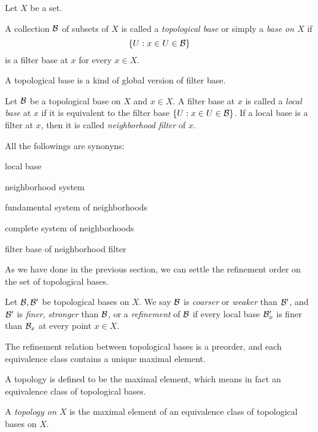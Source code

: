 \documentclass{../crs}
\begin{document}
Let $X$ be a set.
\begin{defn}
A collection $\mathcal{B}$ of subsets of $X$ is called a \emph{topological base} or simply a \emph{base on $X$} if
\[\{U:x\in U\in\mathcal{B}\}\]
is a filter base at $x$ for every $x\in X$.
\end{defn}

A topological base is a kind of global version of filter base.

\begin{defn}
Let $\mathcal{B}$ be a topological base on $X$ and $x\in X$.
A filter base at $x$ is called a \emph{local base} at $x$ if it is equivalent to the filter base $\{U:x\in U\in\mathcal{B}\}$.
If a local base is a filter at $x$, then it is called \emph{neighborhood filter} of $x$.
\end{defn}
All the followings are synonyns:
\begin{cond}
\item local base
\item neighborhood system
\item fundamental system of neighborhoods
\item complete system of neighborhoods
\item filter base of neighborhood filter
\end{cond}

As we have done in the previous section, we can settle the refinement order on the set of topological bases.

\begin{defn}
Let $\mathcal{B},\mathcal{B}'$ be topological bases on $X$.
We say $\mathcal{B}$ is \emph{coarser} or \emph{weaker} than $\mathcal{B}'$, and $\mathcal{B}'$ is \emph{finer}, \emph{stronger} than $\mathcal{B}$, or a \emph{refinement} of $\mathcal{B}$ if every local base $\mathcal{B}'_x$ is finer than $\mathcal{B}_x$ at every point $x\in X$.
\end{defn}
\begin{prop}
The refinement relation between topological bases is a preorder, and each equivalence class contains a unique maximal element.
\end{prop}
\begin{pf}
\end{pf}

A topology is defined to be the maximal element, which means in fact an equivalence class of topological bases.

\begin{defn}
A \emph{topology on $X$} is the maximal element of an equivalence class of topological bases on $X$.
\end{defn}
\end{document}
